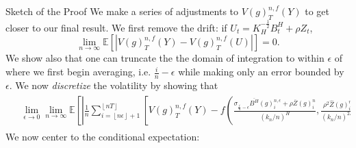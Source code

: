 \documentclass[final,hyperref={pdfpagelabels=false}]{beamer}
\newcommand{\E}{\mathbb{E}}
\begin{document}
\begin{frame}{}
\begin{columns}[t]
\begin{column}{0.4\linewidth}
        \begin{block}{Sketch of the Proof}
          We make a series of adjustments to \(V(g)^{n,f}_T(Y)\) to get closer to our final result. We first remove the drift: if \(U_t = K_H^{-\frac{1}{2}}B^H_t + \rho Z_t\),
          \begin{equation*}
            \lim_{n \rightarrow \infty} \E\left[ \left| V(g)^{n,f}_T(Y) - V(g)^{n,f}_T(U) \right| \right] = 0.
          \end{equation*}
          We show also that one can truncate the the domain of integration to within \(\epsilon\) of where we first begin averaging, i.e. \(\frac{i}{n} - \epsilon\) while making only an error bounded by \(\epsilon\).
          We now \textit{discretize} the volatility by showing that
          \begin{align*}
            \phantom{}
            \begin{aligned}
      &\lim_{\epsilon \rightarrow 0}\lim_{n \rightarrow \infty}\E \left[ \left| \frac{1}{n}\sum_{i=\left\lfloor n\epsilon \right\rfloor + 1}^{\left\lfloor nT \right\rfloor} \left[ V(g)^{n,f}_T(Y) -  f\left( \frac{\sigma_{\frac{i}{n}-\epsilon}\overline{B^H}(g)^{n,\epsilon}_i + \rho\overline{Z}(g)^n_i}{(k_n/n)^{H}}, \frac{\rho^2\widehat{Z}(g)^n_i}{(k_n/n)^{2H}}\right) \right] \right| \right] = 0
            \end{aligned}
          \end{align*}
          We now center to the conditional expectation:
          \begin{align*}

\end{align*}
\end{block}
\end{column}
\end{columns}
\end{frame}
\end{document}
